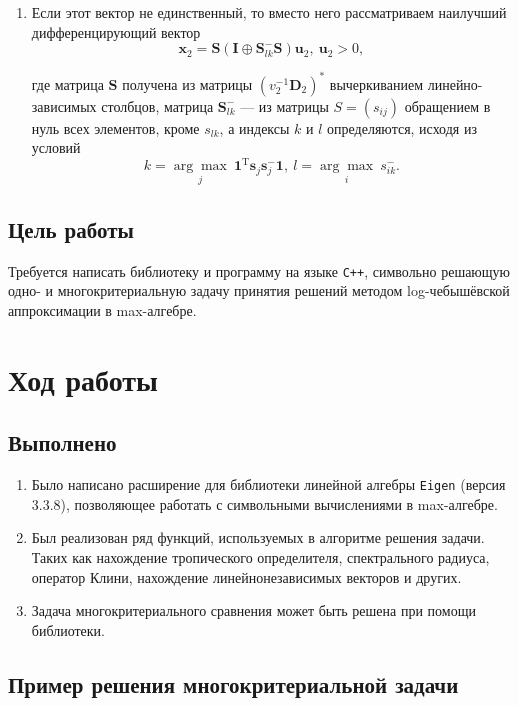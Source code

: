 \documentclass[specialist,
	substylefile = spbu_report.rtx,
	subf,href,colorlinks=true, 12pt]{disser}
\begin{document}
\begin{enumerate}
	\item Если этот вектор не единственный, то вместо него рассматриваем наилучший дифференцирующий вектор
	      \[
		      \boldsymbol{x}_2 =\boldsymbol{S}(\boldsymbol{I}\oplus\boldsymbol{S}^-_{lk}\boldsymbol{S})\boldsymbol{u}_2,~ \boldsymbol{u}_2 > 0,
	      \]

	      где матрица $\boldsymbol{S}$ получена из матрицы $(v^{-1}_2\boldsymbol{D}_2)^*$ вычеркиванием линейно-зависимых столбцов, матрица $\boldsymbol{S}^-_{lk}$ --- из матрицы $S = (s_{ij})$ обращением
	      в нуль всех элементов, кроме $s_{lk}$, а индексы $k$ и $l$ определяются, исходя из условий
	      \[
		      k = \underset{j}{\arg\max}~\boldsymbol{1}^\mathrm{T}\boldsymbol{s}_j\boldsymbol{s}^-_j\boldsymbol{1},~l = \underset{i}{\arg\max} ~s^-_{ik}.
	      \]
\end{enumerate}


\section{Цель работы}
Требуется написать библиотеку и программу на языке \texttt{C++}, символьно решающую одно- и многокритериальную задачу принятия решений методом log-чебышёвской аппроксимации в max-алгебре.

\chapter{Ход работы}
\section{Выполнено}
\begin{enumerate}
	\item Было написано расширение для библиотеки линейной алгебры \texttt{Eigen} \cite{eigenweb} (версия 3.3.8), позволяющее работать с символьными вычислениями в max-алгебре.
	\item Был реализован ряд функций, используемых в алгоритме решения задачи. Таких как
        нахождение тропического определителя, спектрального радиуса, оператор Клини, нахождение линейнонезависимых векторов и других.
	\item Задача многокритериального сравнения может быть решена при помощи библиотеки.
\end{enumerate}

\section{Пример решения многокритериальной задачи}
\end{document}
